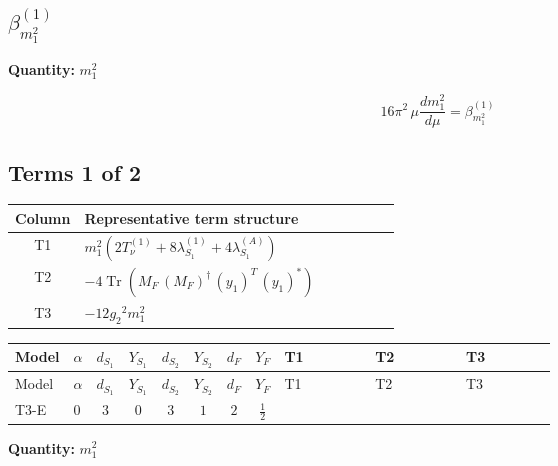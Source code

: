 \documentclass[8pt]{article}
\begin{document}
\begin{landscape}
\section*{$\beta_{m_1^2}^{(1)}$}
\noindent\textbf{Quantity: }$m_1^2$\par\smallskip
\[16\pi^2\,\mu\frac{d m_1^2}{d\mu}=\beta_{m_1^2}^{(1)}\]
\subsection*{Terms 1 of 2}
\begin{center}
\begin{tabular}{@{}c >{\raggedright\arraybackslash}p{0.82\linewidth}@{}}
\toprule
Column & Representative term structure \\
\midrule
T1 & \(\displaystyle {m_1^2} (2 T_{\nu}^{(1)}+8 {\lambda_{S_1}^{(1)}}+4 {\lambda_{S_1}^{(A)}})\) \\
\midrule
T2 & \(\displaystyle -4 \operatorname{Tr}\!\left({M_F}\,\left({M_F}\right)^{\dagger}\,\left({y_1}\right)^{T}\,\left({y_1}\right)^{*}\right)\) \\
\midrule
T3 & \(\displaystyle -12 {g_2}^2 {m_1^2}\) \\
\midrule
\bottomrule
\end{tabular}
\end{center}
\smallskip
\tiny
\begin{longtable}{@{}llcccccc >{\raggedright\arraybackslash}p{0.21\linewidth} >{\raggedright\arraybackslash}p{0.21\linewidth} >{\raggedright\arraybackslash}p{0.21\linewidth}@{}}
\toprule
Model & $\alpha$ & $d_{S_1}$ & $Y_{S_1}$ & $d_{S_2}$ & $Y_{S_2}$ & $d_F$ & $Y_F$ & T1 & T2 & T3 \\
\midrule
\endfirsthead
\toprule
Model & $\alpha$ & $d_{S_1}$ & $Y_{S_1}$ & $d_{S_2}$ & $Y_{S_2}$ & $d_F$ & $Y_F$ & T1 & T2 & T3 \\
\midrule
\endhead
T3-E & $0$ & $3$ & $0$ & $3$ & $1$ & $2$ & $\frac{1}{2}$ & \scriptsize\adjustbox{max width=\linewidth}{$\begin{gathered} {m_1^2} (2 T_{\nu}^{(1)}+8 {\lambda_{S_1}^{(1)}}+4 {\lambda_{S_1}^{(A)}})\end{gathered}$} & \scriptsize\adjustbox{max width=\linewidth}{$\begin{gathered} -4 \operatorname{Tr}\!\left({M_F}\,\left({M_F}\right)^{\dagger}\,\left({y_1}\right)^{T}\,\left({y_1}\right)^{*}\right)\end{gathered}$} & \scriptsize\adjustbox{max width=\linewidth}{$\begin{gathered} -12 {g_2}^2 {m_1^2}\end{gathered}$} \\
\midrule
\bottomrule
\end{longtable}
\clearpage
\noindent\textbf{Quantity: }$m_1^2$\par\smallskip

\end{landscape}
\end{document}
